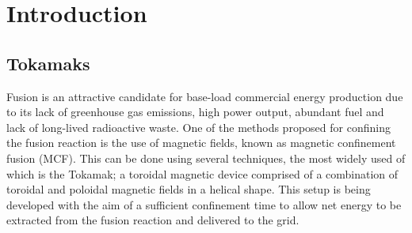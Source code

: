 \documentclass[a4paper, 11pt]{article} %
\begin{document}



\section{\label{sec:intro}Introduction}

\subsection{\label{subsec:tokamaks}Tokamaks}
	Fusion is an attractive candidate for base-load commercial energy production due to its lack of greenhouse gas emissions, high power output, abundant fuel and lack of long-lived radioactive waste.
	One of the methods proposed for confining the fusion reaction is the use of magnetic fields, known as magnetic confinement fusion (MCF).
	This can be done using several techniques, the most widely used of which is the Tokamak; a toroidal magnetic device comprised of a combination of toroidal and poloidal magnetic fields in a helical shape. 
	This setup is being developed with the aim of a sufficient confinement time to allow net energy to be extracted from the fusion reaction and delivered to the grid.  
	
\end{document}
